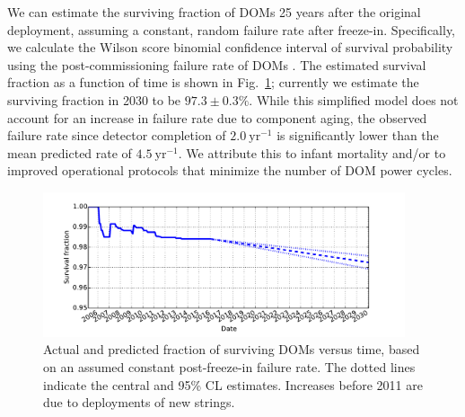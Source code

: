 We can estimate the surviving fraction of DOMs 25 years after the original
deployment, assuming a constant, random failure rate after freeze-in.
Specifically, we calculate the Wilson score binomial confidence interval of
survival probability using the post-commissioning failure rate of DOMs
\cite{Wilson_Score}.  The estimated survival fraction as a function of
time is shown in Fig.~\ref{fig:dom_survival}; currently we estimate the
surviving fraction in 2030 to be $97.3\pm0.3\%$.  While this simplified
model does not account for an increase in failure rate due to component aging, the
observed failure rate since detector completion of $2.0~\mathrm{yr}^{-1}$ is
significantly lower than the mean predicted rate of $4.5~\mathrm{yr}^{-1}$.  We attribute
this to infant mortality and/or to improved operational protocols that
minimize the number of DOM power cycles.

\begin{figure}[!h]
 \centering
 \includegraphics[width=0.95\textwidth]{graphics/dom/reliability/dom_survival.pdf}
 \caption{Actual and predicted fraction of surviving DOMs versus time, based on an assumed
 constant post-freeze-in failure rate.  The dotted lines indicate the
 central and 95\% CL estimates.  Increases before 2011 are due
 to deployments of new strings.} 
 \label{fig:dom_survival}
\end{figure}
